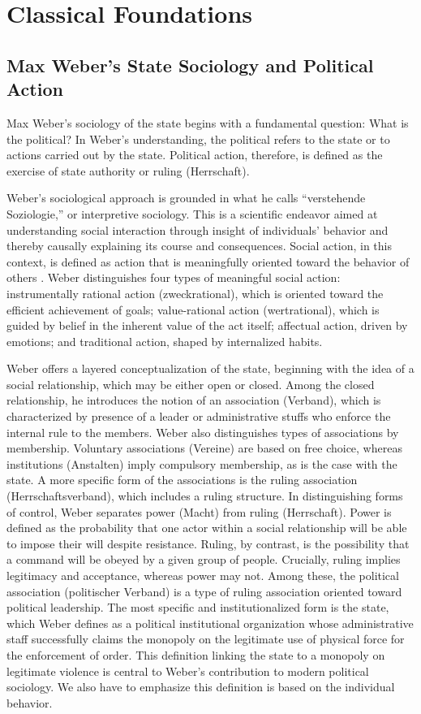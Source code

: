 \documentclass[12pt]{article}
\begin{document}
\section*{Classical Foundations}

\subsection*{Max Weber's State Sociology and Political Action}

Max Weber’s sociology of the state begins with a fundamental question: What is the political? In Weber’s understanding, the political refers to the state or to actions carried out by the state. Political action, therefore, is defined as the exercise of state authority or ruling (Herrschaft).

Weber’s sociological approach is grounded in what he calls “verstehende Soziologie,” or interpretive sociology. This is a scientific endeavor aimed at  understanding social interaction through insight of individuals' behavior  and thereby causally explaining its course and consequences. Social action, in this context, is defined as action that is meaningfully oriented toward the behavior of others \citep{weber22}. Weber distinguishes four types of meaningful social action: instrumentally rational action (zweckrational), which is oriented toward the efficient achievement of goals; value-rational action (wertrational), which is guided by belief in the inherent value of the act itself; affectual action, driven by emotions; and traditional action, shaped by internalized habits.

Weber offers a layered conceptualization of the state, beginning with the idea of a social relationship, which may be either open or closed. Among the closed relationship, he introduces the notion of an association (Verband), which is characterized by presence of a leader or administrative stuffs who enforce the internal rule to the members. Weber also distinguishes types of associations by membership. Voluntary associations (Vereine) are based on free choice, whereas institutions (Anstalten) imply compulsory membership, as is the case with the state. A more specific form of the associations is the ruling association (Herrschaftsverband), which includes a ruling structure. In distinguishing forms of control, Weber separates power (Macht) from ruling (Herrschaft). Power is defined as the probability that one actor within a social relationship will be able to impose their will despite resistance. Ruling, by contrast, is the possibility that a command will be obeyed by a given group of people. Crucially, ruling  implies legitimacy and acceptance, whereas power may not. Among these, the political association (politischer Verband) is a type of ruling association oriented toward political leadership. The most specific and institutionalized form is the state, which Weber defines as a political institutional organization whose administrative staff successfully claims the monopoly on the legitimate use of physical force for the enforcement of order. This definition linking the state to a monopoly on legitimate violence is central to Weber’s contribution to modern political sociology. We also have to emphasize this definition is based on the individual behavior.
\end{document}
